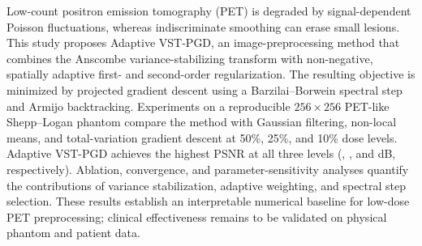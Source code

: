 Low-count positron emission tomography (PET) is degraded by signal-dependent Poisson fluctuations, whereas indiscriminate smoothing can erase small lesions. This study proposes Adaptive VST-PGD, an image-preprocessing method that combines the Anscombe variance-stabilizing transform with non-negative, spatially adaptive first- and second-order regularization. The resulting objective is minimized by projected gradient descent using a Barzilai--Borwein spectral step and Armijo backtracking. Experiments on a reproducible $256\times256$ PET-like Shepp--Logan phantom compare the method with Gaussian filtering, non-local means, and total-variation gradient descent at 50\%, 25\%, and 10\% dose levels. Adaptive VST-PGD achieves the highest PSNR at all three levels (\ProposedPSNRFifty, \ProposedPSNRTwentyFive, and \ProposedPSNRTen{} dB, respectively). Ablation, convergence, and parameter-sensitivity analyses quantify the contributions of variance stabilization, adaptive weighting, and spectral step selection. These results establish an interpretable numerical baseline for low-dose PET preprocessing; clinical effectiveness remains to be validated on physical phantom and patient data.
